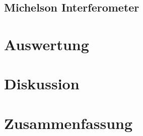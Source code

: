 \documentclass[ngerman]{scrartcl}
\begin{document}
\subsection{Michelson Interferometer}
\label{sec:durchfuehrung_michelson}



\section{Auswertung}
\label{sec:auswertung}





\section{Diskussion}
\label{sec:diskussion}


\section{Zusammenfassung}
\label{sec:zusammenfassung}


\clearpage
\printbibliography

\listoffigures

\listoftables
\end{document}
